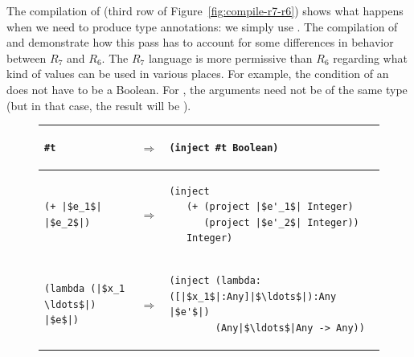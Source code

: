 \documentclass[11pt]{book}
\begin{document}
The compilation of  (third row of
Figure~\ref{fig:compile-r7-r6}) shows what happens when we need to
produce type annotations: we simply use .
%
The compilation of  and   demonstrate how this pass
has to account for some differences in behavior between $R_7$ and
$R_6$. The $R_7$ language is more permissive than $R_6$ regarding what
kind of values can be used in various places. For example, the
condition of an  does not have to be a Boolean. For ,
the arguments need not be of the same type (but in that case, the
result will be ).

\begin{figure}[btp]
\centering
\begin{tabular}{|lll|} \hline
\begin{minipage}{0.25\textwidth}
\begin{lstlisting}
#t
\end{lstlisting}
\end{minipage}
&
$\Rightarrow$
&
\begin{minipage}{0.6\textwidth}
\begin{lstlisting}
(inject #t Boolean)
\end{lstlisting}
\end{minipage}
\\[2ex]\hline
\begin{minipage}{0.25\textwidth}
\begin{lstlisting}
(+ |$e_1$| |$e_2$|)
\end{lstlisting}
\end{minipage}
&
$\Rightarrow$
&
\begin{minipage}{0.6\textwidth}
\begin{lstlisting}
(inject
   (+ (project |$e'_1$| Integer)
      (project |$e'_2$| Integer))
   Integer)
\end{lstlisting}
\end{minipage}
\\[2ex]\hline
\begin{minipage}{0.25\textwidth}
\begin{lstlisting}
(lambda (|$x_1 \ldots$|) |$e$|)
\end{lstlisting}
\end{minipage}
&
$\Rightarrow$
&
\begin{minipage}{0.6\textwidth}
\begin{lstlisting}
(inject (lambda: ([|$x_1$|:Any]|$\ldots$|):Any |$e'$|)
        (Any|$\ldots$|Any -> Any))
\end{lstlisting}

\end{minipage}
\end{tabular}
\end{figure}
\end{document}
